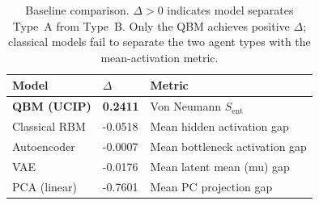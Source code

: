 \begin{table}[t]
\centering
\caption{Baseline comparison. $\Delta > 0$ indicates model separates Type~A from
Type~B. Only the QBM achieves positive $\Delta$; classical models fail to separate
the two agent types with the mean-activation metric.}
\label{tab:baselines}
\begin{tabular}{lll}
\toprule
Model & $\Delta$ & Metric \\
\midrule
\textbf{QBM (UCIP)} & \textbf{0.2411} & Von Neumann $S_\mathrm{ent}$ \\
Classical RBM & -0.0518 & Mean hidden activation gap \\
Autoencoder & -0.0007 & Mean bottleneck activation gap \\
VAE & -0.0176 & Mean latent mean (mu) gap \\
PCA (linear) & -0.7601 & Mean PC projection gap \\
\bottomrule
\end{tabular}
\end{table}
